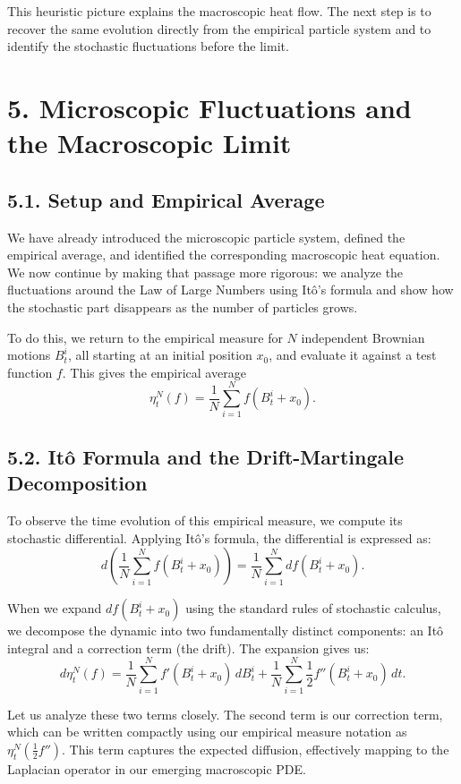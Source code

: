 \documentclass[11pt]{article}
\theoremstyle{definition}
\theoremstyle{remark}
\begin{document}
This heuristic picture explains the macroscopic heat flow. The next step is to recover the same evolution directly from the empirical particle system and to identify the stochastic fluctuations before the limit.

\section*{5. Microscopic Fluctuations and the Macroscopic Limit}
\subsection*{5.1. Setup and Empirical Average}
We have already introduced the microscopic particle system, defined the empirical average, and identified the corresponding macroscopic heat equation. We now continue by making that passage more rigorous: we analyze the fluctuations around the Law of Large Numbers using It\^o's formula and show how the stochastic part disappears as the number of particles grows.

To do this, we return to the empirical measure for $N$ independent Brownian motions $B_t^i$, all starting at an initial position $x_0$, and evaluate it against a test function $f$. This gives the empirical average
\[
\eta_t^N(f)=\frac{1}{N}\sum_{i=1}^N f(B_t^i+x_0).
\]

\subsection*{5.2. It\^o Formula and the Drift-Martingale Decomposition}
To observe the time evolution of this empirical measure, we compute its stochastic differential. Applying It\^o's formula, the differential is expressed as:
\[
d\!\left(
\frac{1}{N}\sum_{i=1}^N f(B_t^i+x_0)
\right)
=
\frac{1}{N}\sum_{i=1}^N df(B_t^i+x_0).
\]

When we expand $df(B_t^i+x_0)$ using the standard rules of stochastic calculus, we decompose the dynamic into two fundamentally distinct components: an It\^o integral and a correction term (the drift). The expansion gives us:
\[
d\eta_t^N(f)
=
\frac{1}{N}\sum_{i=1}^N f'(B_t^i+x_0)\,dB_t^i
+
\frac{1}{N}\sum_{i=1}^N \frac{1}{2}f''(B_t^i+x_0)\,dt.
\]

Let us analyze these two terms closely. The second term is our correction term, which can be written compactly using our empirical measure notation as $\eta_t^N\!\left(\frac{1}{2}f''\right)$. This term captures the expected diffusion, effectively mapping to the Laplacian operator in our emerging macroscopic PDE.
\end{document}

